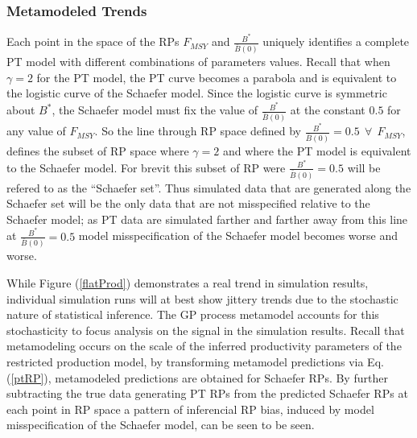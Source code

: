 \documentclass[12pt]{article}
\begin{document}
%
\subsubsection{Metamodeled Trends}


%
Each point in the space of the RPs $F_{MSY}$ and $\frac{B^*}{\bar B(0)}$ uniquely 
identifies a complete PT model with different combinations of parameters values. 
Recall that when $\gamma=2$ for the PT model, the PT curve becomes a parabola 
and is equivalent to the logistic curve of the Schaefer model. Since the 
logistic curve is symmetric about $B^*$, the Schaefer model must fix the value of 
$\frac{B^*}{\bar B(0)}$ at the constant $0.5$ for any value of $F_{MSY}$. So 
the line through RP space defined by $\frac{B^*}{\bar B(0)}=0.5 ~~ \forall ~~ F_{MSY}$, 
defines the subset of RP space where $\gamma=2$ and where the PT model is 
equivalent to the Schaefer model. For brevit this subset of RP were $\frac{B^*}{\bar B(0)}=0.5$ 
will be refered to as the ``Schaefer set''. Thus simulated data that are 
generated along the Schaefer set will be the only data that are not 
misspecified relative to the Schaefer model; as PT data are simulated 
farther and farther away from this line at $\frac{B^*}{\bar B(0)}=0.5$ model 
misspecification of the Schaefer model becomes worse and worse.


%
While Figure (\ref{flatProd}) demonstrates a real trend in simulation results, 
individual simulation runs will at best show jittery trends due to the stochastic 
nature of statistical inference. The GP process metamodel accounts for this 
stochasticity %
to focus analysis on the signal in the simulation results. Recall that metamodeling 
occurs on the scale of the inferred productivity parameters of the restricted 
production model, 
by transforming metamodel predictions via Eq. (\ref{ptRP}), metamodeled predictions 
are obtained for Schaefer RPs. By further subtracting the true data generating 
PT RPs from the predicted Schaefer RPs at each point in RP space a pattern of 
inferencial RP bias, induced by model misspecification of the Schaefer model, 
can be seen to be seen. %
\end{document}

